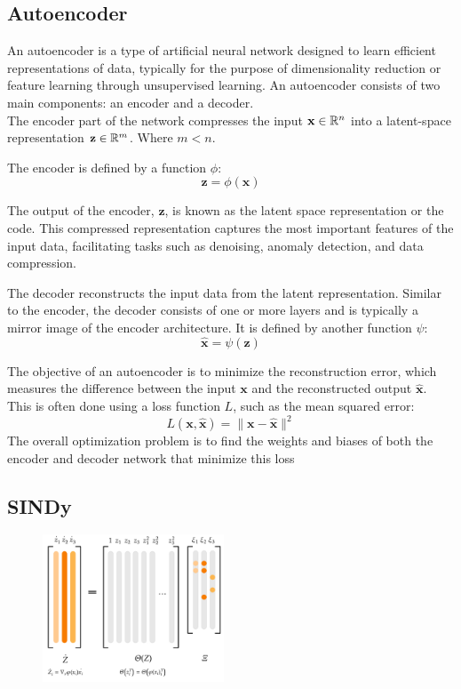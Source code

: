 
\subsection{Autoencoder}
An autoencoder \cite{hinton2006reducing} is a type of artificial neural network designed to learn efficient representations of data, typically for the purpose of dimensionality reduction or feature learning through unsupervised learning. An autoencoder consists of two main components: an encoder and a decoder.\\

The encoder part of the network compresses the input 
$\mathbf{x} \in \mathbb{R}^n$ into a latent-space representation $\mathbf{z} \in \mathbb{R}^m$. Where $m < n$.

The encoder is defined by a function $\phi$:
$$
\mathbf{z}=\phi(\mathbf{x})
$$

The output of the encoder, $\mathbf z$, is known as the latent space representation or the code. This compressed representation captures the most important features of the input data, facilitating tasks such as denoising, anomaly detection, and data compression.

The decoder reconstructs the input data from the latent representation. Similar to the encoder, the decoder consists of one or more layers and is typically a mirror image of the encoder architecture. It is defined by another function $\psi$:
$$
\hat{\mathbf{x}}=\psi(\mathbf{z})
$$

The objective of an autoencoder is to minimize the reconstruction error, which measures the difference between the input $\mathbf{x}$ and the reconstructed output $\hat{\mathbf{x}}$. This is often done using a loss function $L$, such as the mean squared error:
$$
L(\mathbf{x}, \hat{\mathbf{x}})=\|\mathbf{x}-\hat{\mathbf{x}}\|^2
$$
The overall optimization problem is to find the weights and biases of both the encoder and decoder network that minimize this loss

\subsection{SINDy}

\begin{figure}[H]
    \centering
    \includegraphics[width=0.48\textwidth]{project_2/images/SINDy_diagram.pdf}
    \caption{}
    \label{fig:SINDy_diagram}
\end{figure}

